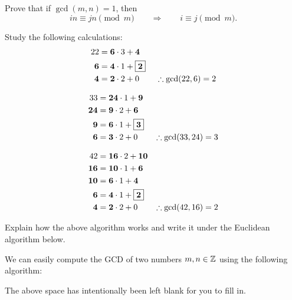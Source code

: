 \documentclass{ximera}
\begin{document}
\begin{exercise} Prove that if $\gcd(m,n) = 1$, then 
\[
in \equiv jn \pmod m \qquad \Rightarrow\qquad i\equiv j\pmod m.
\]
\end{exercise}



\begin{exercise} Study the following calculations:
\begin{align*}
  22 &= \boldsymbol{6}\cdot 3 + \boldsymbol{4}\\
  \boldsymbol{6} &= \boldsymbol{4} \cdot 1 + \fbox{$\boldsymbol{2}$}\\
  \boldsymbol{4} &= \boldsymbol{2} \cdot 2 + 0 \qquad
\therefore \gcd(22,6) = 2
\end{align*}

\begin{align*}
33 &= \boldsymbol{24}\cdot 1 + \boldsymbol{9}\\
\boldsymbol{24} &= \boldsymbol{9} \cdot 2 + \boldsymbol{6}\\
\boldsymbol{9} &= \boldsymbol{6} \cdot 1 + \fbox{$\boldsymbol{3}$}\\
\boldsymbol{6} &= \boldsymbol{3} \cdot 2 + 0 \qquad \therefore \gcd(33,24) = 3 
\end{align*}

\begin{align*}
42 &= \boldsymbol{16}\cdot 2 + \boldsymbol{10}\\
\boldsymbol{16} &= \boldsymbol{10} \cdot 1 + \boldsymbol{6}\\
\boldsymbol{10} &= \boldsymbol{6} \cdot 1 + \boldsymbol{4}\\
\boldsymbol{6} &= \boldsymbol{4} \cdot 1 + \fbox{$\boldsymbol{2}$}\\
\boldsymbol{4} &= \boldsymbol{2} \cdot 2 + 0 \qquad \therefore \gcd(42,16) = 2 
\end{align*}

Explain how the above algorithm works and write it under the Euclidean
algorithm below.
\end{exercise}


\begin{theorem} 
We can easily compute the GCD of two numbers $m,n\in\mathbb Z$ using the
following algorithm:
\vspace{2in}

\end{theorem}
\noindent The above space has intentionally been left blank for you to
fill in.
\end{document}
